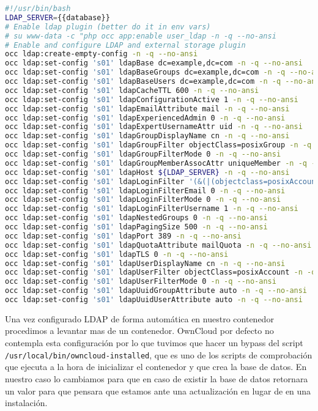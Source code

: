 \begin{lstlisting}[language=bash,caption={bash version}]
#!/usr/bin/bash
LDAP_SERVER={{database}}
# Enable ldap plugin (better do it in env vars)
# su www-data -c "php occ app:enable user_ldap -n -q --no-ansi
# Enable and configure LDAP and external storage plugin
occ ldap:create-empty-config -n -q --no-ansi
occ ldap:set-config 's01' ldapBase dc=example,dc=com -n -q --no-ansi
occ ldap:set-config 's01' ldapBaseGroups dc=example,dc=com -n -q --no-ansi
occ ldap:set-config 's01' ldapBaseUsers dc=example,dc=com -n -q --no-ansi
occ ldap:set-config 's01' ldapCacheTTL 600 -n -q --no-ansi
occ ldap:set-config 's01' ldapConfigurationActive 1 -n -q --no-ansi
occ ldap:set-config 's01' ldapEmailAttribute mail -n -q --no-ansi
occ ldap:set-config 's01' ldapExperiencedAdmin 0 -n -q --no-ansi
occ ldap:set-config 's01' ldapExpertUsernameAttr uid -n -q --no-ansi
occ ldap:set-config 's01' ldapGroupDisplayName cn -n -q --no-ansi
occ ldap:set-config 's01' ldapGroupFilter objectClass=posixGroup -n -q --no-ansi
occ ldap:set-config 's01' ldapGroupFilterMode 0 -n -q --no-ansi
occ ldap:set-config 's01' ldapGroupMemberAssocAttr uniqueMember -n -q --no-ansi
occ ldap:set-config 's01' ldapHost ${LDAP_SERVER} -n -q --no-ansi
occ ldap:set-config 's01' ldapLoginFilter '(&(|(objectclass=posixAccount))(uid=%uid))' -n -q --no-ansi
occ ldap:set-config 's01' ldapLoginFilterEmail 0 -n -q --no-ansi
occ ldap:set-config 's01' ldapLoginFilterMode 0 -n -q --no-ansi
occ ldap:set-config 's01' ldapLoginFilterUsername 1 -n -q --no-ansi
occ ldap:set-config 's01' ldapNestedGroups 0 -n -q --no-ansi
occ ldap:set-config 's01' ldapPagingSize 500 -n -q --no-ansi
occ ldap:set-config 's01' ldapPort 389 -n -q --no-ansi
occ ldap:set-config 's01' ldapQuotaAttribute mailQuota -n -q --no-ansi
occ ldap:set-config 's01' ldapTLS 0 -n -q --no-ansi
occ ldap:set-config 's01' ldapUserDisplayName cn -n -q --no-ansi
occ ldap:set-config 's01' ldapUserFilter objectClass=posixAccount -n -q --no-ansi
occ ldap:set-config 's01' ldapUserFilterMode 0 -n -q --no-ansi
occ ldap:set-config 's01' ldapUuidGroupAttribute auto -n -q --no-ansi
occ ldap:set-config 's01' ldapUuidUserAttribute auto -n -q --no-ansi
\end{lstlisting}

Una vez configurado LDAP de forma automática en nuestro contenedor procedimos a levantar mas de un contenedor. OwnCloud por defecto no contempla esta configuración por lo que tuvimos que hacer un bypass del script \texttt{/usr/local/bin/owncloud-installed}, que es uno de los scripts de comprobación que ejecuta a la hora de inicializar el contenedor y que crea la base de datos. En nuestro caso lo cambiamos para que en caso de existir la base de datos retornara un valor para que pensara que estamos ante una actualización en lugar de en una instalación.

